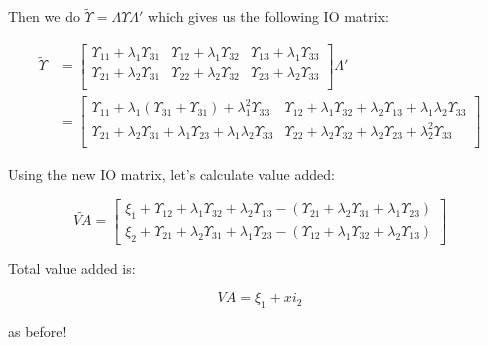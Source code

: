 \documentclass[12pt,english]{article}
\begin{document}
Then we do $\tilde{\Upsilon} = \Lambda \Upsilon \Lambda'$ which gives us the following IO matrix:

\begin{align*}
\tilde{\Upsilon}&=\begin{bmatrix}
\Upsilon_{11}+\lambda_1\Upsilon_{31}&\Upsilon_{12}+\lambda_1\Upsilon_{32}&\Upsilon_{13}+\lambda_1\Upsilon_{33}\\
\Upsilon_{21}+\lambda_2\Upsilon_{31}&\Upsilon_{22}+\lambda_2\Upsilon_{32}&\Upsilon_{23}+\lambda_2\Upsilon_{33}\\
\end{bmatrix}\Lambda'\\
& = \begin{bmatrix}
\Upsilon_{11}+\lambda_1(\Upsilon_{31}+\Upsilon_{31})+\lambda_1^2\Upsilon_{33}&\Upsilon_{12}+\lambda_1\Upsilon_{32}+\lambda_2\Upsilon_{13}+\lambda_1\lambda_2\Upsilon_{33}\\
\Upsilon_{21}+\lambda_2\Upsilon_{31}+\lambda_1\Upsilon_{23}+\lambda_1\lambda_2\Upsilon_{33}&\Upsilon_{22}+\lambda_2\Upsilon_{32}+\lambda_2\Upsilon_{23}+\lambda_2^2\Upsilon_{33}\\
\end{bmatrix}
\end{align*}

Using the new IO matrix, let's calculate value added:

$$
	\tilde{VA} = \begin{bmatrix}
		\xi_1 + \Upsilon_{12}+\lambda_1\Upsilon_{32}+\lambda_2\Upsilon_{13} - (\Upsilon_{21}+\lambda_2\Upsilon_{31}+\lambda_1\Upsilon_{23})\\
		\xi_2 + \Upsilon_{21}+\lambda_2\Upsilon_{31}+\lambda_1\Upsilon_{23} - (\Upsilon_{12}+\lambda_1\Upsilon_{32}+\lambda_2\Upsilon_{13})
	\end{bmatrix}
$$

Total value added is:

$$
	VA = \xi_1 + xi_2
$$

as before!
\end{document}
